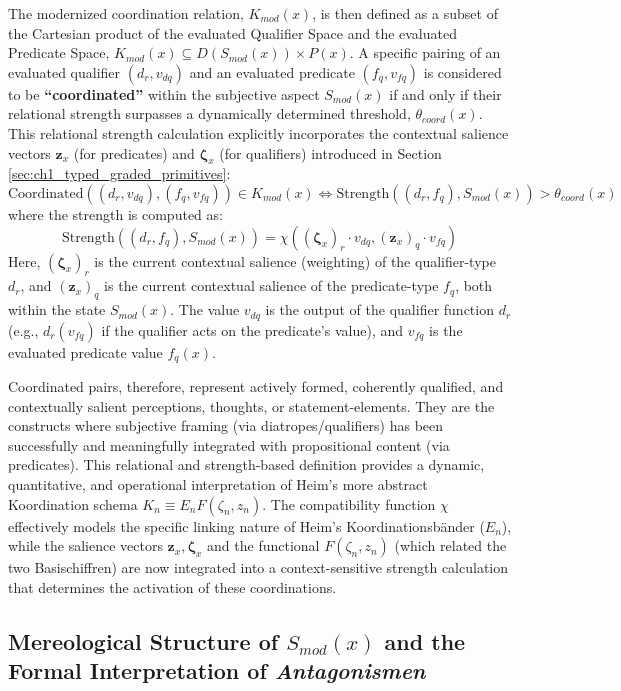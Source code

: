 \documentclass[
    12pt,              %
    a4paper,           %
    headings=normal,   %
    twoside=true,      %
    BCOR=8mm,          %
]{scrbook}
\begin{document}
The modernized coordination relation, \(K_{mod}(x)\), is then defined as a subset of the Cartesian product of the evaluated Qualifier Space and the evaluated Predicate Space, \(K_{mod}(x) \subseteq D(S_{mod}(x)) \times P(x)\). A specific pairing of an evaluated qualifier \((d_r, v_{dq})\) and an evaluated predicate \((f_q, v_{fq})\) is considered to be \textbf{“coordinated”} within the subjective aspect \(S_{mod}(x)\) if and only if their relational strength surpasses a dynamically determined threshold, \(\theta_{coord}(x)\). This relational strength calculation explicitly incorporates the contextual salience vectors \(\mathbf{z}_x\) (for predicates) and \(\mathbf{\zeta}_x\) (for qualifiers) introduced in Section \ref{sec:ch1_typed_graded_primitives}:
\[ \text{Coordinated}((d_r, v_{dq}), (f_q, v_{fq})) \in K_{mod}(x) \iff \text{Strength}((d_r,f_q), S_{mod}(x)) > \theta_{coord}(x) \]
where the strength is computed as:
\[ \text{Strength}((d_r,f_q), S_{mod}(x)) = \chi( (\mathbf{\zeta}_x)_r \cdot v_{dq}, (\mathbf{z}_x)_q \cdot v_{fq} ) \]
Here, \((\mathbf{\zeta}_x)_r\) is the current contextual salience (weighting) of the qualifier-type \(d_r\), and \((\mathbf{z}_x)_q\) is the current contextual salience of the predicate-type \(f_q\), both within the state \(S_{mod}(x)\). The value \(v_{dq}\) is the output of the qualifier function \(d_r\) (e.g., \(d_r(v_{fq})\) if the qualifier acts on the predicate's value), and \(v_{fq}\) is the evaluated predicate value \(f_q(x)\).

Coordinated pairs, therefore, represent actively formed, coherently qualified, and contextually salient perceptions, thoughts, or statement-elements. They are the constructs where subjective framing (via diatropes/qualifiers) has been successfully and meaningfully integrated with propositional content (via predicates). This relational and strength-based definition provides a dynamic, quantitative, and operational interpretation of Heim's more abstract Koordination schema \(K_n \equiv E_n F(\zeta_n, z_n)\). The compatibility function \(\chi\) effectively models the specific linking nature of Heim’s Koordinationsbänder (\(E_n\)), while the salience vectors \(\mathbf{z}_x, \mathbf{\zeta}_x\) and the functional \(F(\zeta_n, z_n)\) (which related the two Basischiffren) are now integrated into a context-sensitive strength calculation that determines the activation of these coordinations.

\subsection{Mereological Structure of \(S_{mod}(x)\) and the Formal Interpretation of \textit{Antagonismen}}
\label{sec:ch1_mereological_structure} 
\end{document}
